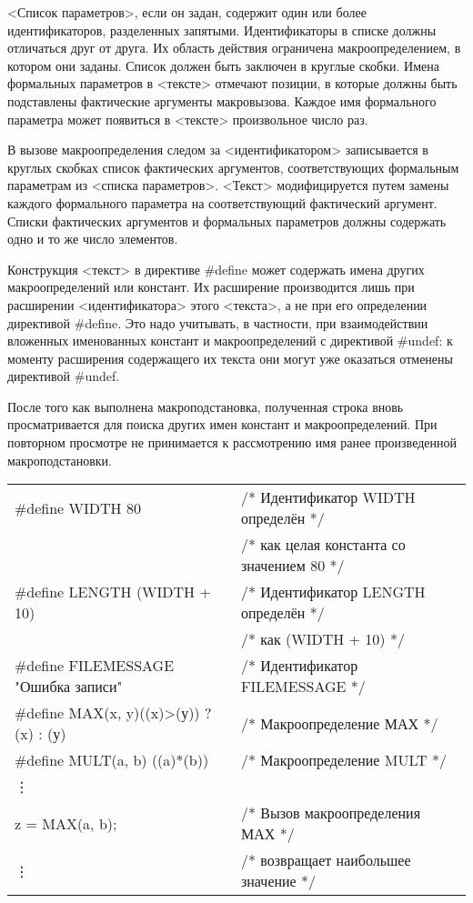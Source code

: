 <Список параметров>, если он задан, содержит один или более идентификаторов, разделенных запятыми. Идентификаторы в списке должны отличаться друг от друга. Их область действия ограничена макроопределением, в котором они заданы. Список должен быть заключен в круглые скобки. Имена формальных параметров в <тексте> отмечают позиции, в которые должны быть подставлены фактические аргументы макровызова. Каждое имя формального параметра может появиться в <тексте> произвольное число раз.\killoverfullbefore

В вызове макроопределения следом за <идентификатором> записывается в круглых скобках список фактических аргументов, соответствующих формальным параметрам из <списка параметров>. <Текст> модифицируется путем замены каждого формального параметра на соответствующий фактический аргумент. Списки фактических аргументов и формальных параметров должны содержать одно и то же число элементов.\killoverfullbefore

Конструкция <текст> в директиве \#define может содержать имена других макроопределений или констант. Их расширение производится лишь при расширении <идентификатора> этого <текста>, а не при его определении директивой \#define. Это надо учитывать, в частности, при взаимодействии вложенных именованных констант и макроопределений с директивой \#undef: к моменту расширения содержащего их текста они могут уже оказаться отменены директивой \#undef.\killoverfullbefore

После того как выполнена макроподстановка, полученная строка вновь просматривается для поиска других имен констант и макроопределений. При повторном просмотре не принимается к рассмотрению имя ранее произведенной макроподстановки.\killoverfullbefore \BL

\renewcommand{\arraystretch}{1.2} %
\renewcommand{\tabcolsep}{0.2cm}   %
\begin{pExample}
\begin{tabular}{ l l }
\#define WIDTH 80 & \textcolor{exComm}{/* Идентификатор WIDTH определён */}  \\
 & \textcolor{exComm}{/* как целая константа со значением 80 */}  \\
\#define LENGTH (WIDTH + 10) & \textcolor{exComm}{/* Идентификатор LENGTH определён */} \\
 & \textcolor{exComm}{/* как (WIDTH + 10)  */} \\
\#define FILEMESSAGE "Ошибка записи" & \textcolor{exComm}{/* Идентификатор FILEMESSAGE */} \\
\#define MAX(x, y)((x)>(у)) ? (x) : (у) & \textcolor{exComm}{/* Макроопределение МАХ */} \\
\#define MULT(a, b) ((a)*(b)) & \textcolor{exComm}{/* Макроопределение MULT */} \\
\vdots & \textcolor{exComm}{ } \\
z =  MAX(a, b); & \textcolor{exComm}{/* Вызов макроопределения МАХ */} \\
\vdots & \textcolor{exComm}{/* возвращает наибольшее значение */} \\
\end{tabular}
\end{pExample}

